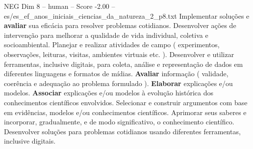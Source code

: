 \begin{textsample}{NEG Dim 8 – human – Score -2.00 – es/es\_ef\_anos\_iniciais\_ciencias\_da\_natureza\_2\_p8.txt}  \label{ex:f8_neg_007}
Implementar soluções e \textbf{avaliar} sua eficácia para resolver problemas cotidianos.
Desenvolver ações de intervenção para melhorar a qualidade de vida individual, coletiva e socioambiental.
Planejar e realizar atividades de campo ( experimentos, observações, leituras, visitas, ambientes virtuais etc. ).
Desenvolver e utilizar ferramentas, inclusive digitais, para coleta, análise e representação de dados em diferentes linguagens e formatos de mídias. \textbf{Avaliar} informação ( validade, coerência e adequação ao problema formulado ). \textbf{Elaborar} explicações e/ou modelos. \textbf{Associar} explicações e/ou modelos à evolução histórica dos conhecimentos científicos envolvidos.
Selecionar e construir argumentos com base em evidências, modelos e/ou conhecimentos científicos.
Aprimorar seus saberes e incorporar, gradualmente, e de modo significativo, o conhecimento científico.
Desenvolver soluções para problemas cotidianos usando diferentes ferramentas, inclusive digitais.

\end{textsample}
